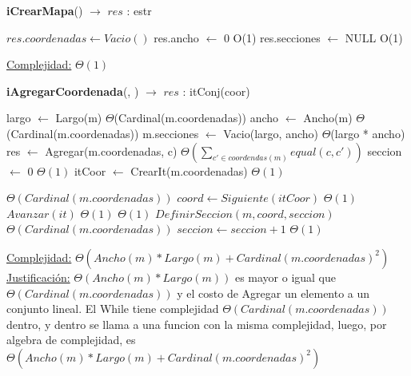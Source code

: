 \begin{Algoritmos}

\medskip
	
  	\medskip
  
\begin{algorithm}[H]{\textbf{iCrearMapa}() $\to$ $res$ : estr}
    	\begin{algorithmic}[1]
			\State $res.coordenadas \gets Vacio()$ 
			\State res.ancho $\gets$ 0	\Comment O(1)
			\State res.secciones $\gets$ NULL \Comment O(1)
			
			\medskip
			\Statex \underline{Complejidad:} $\Theta(1)$
    	\end{algorithmic}
\end{algorithm}

\begin{algorithm}[H]{\textbf{iAgregarCoordenada}(, ) $\to$ $res$ : itConj(coor)}
    	\begin{algorithmic}[1]
            \State  largo $\gets$ Largo(m)   \Comment $\Theta$(Cardinal(m.coordenadas))
            \State  ancho $\gets$ Ancho(m) \Comment $\Theta$(Cardinal(m.coordenadas))
            \State  m.secciones $\gets$ Vacio(largo, ancho) \Comment $\Theta$(largo * ancho)
			\State res $\gets$ Agregar(m.coordenadas, c) \Comment $\Theta\left(\displaystyle\sum_{c' \in coordendas(m)}equal(c,c')\right)$
            \State  seccion $\gets$ 0  \Comment $\Theta(1)$
            \State  itCoor $\gets$ CrearIt(m.coordenadas) \Comment $\Theta(1)$
			 
            			\Comment $\Theta(Cardinal(m.coordenadas))$
                \State $coord \gets Siguiente(itCoor)  $ \Comment $\Theta(1)$
			 	\State $Avanzar(it)$		\Comment $\Theta(1)$
                 \Comment $\Theta(1)$
                    \State $ DefinirSeccion(m, coord, seccion) $ \Comment $\Theta(Cardinal(m.coordenadas))$ 
                    \State $ seccion \gets seccion + 1 $ \Comment $\Theta(1)$
                \EndIf
			\EndWhile

			\medskip
			\Statex \underline{Complejidad:} $\Theta(Ancho(m) * Largo(m) + Cardinal(m.coordenadas)^2)$
			\Statex \underline{Justificación:} $\Theta(Ancho(m) * Largo(m))$ es mayor o igual que $\Theta(Cardinal(m.coordenadas))$ y el costo de Agregar un elemento a un conjunto lineal. El While tiene complejidad $\Theta(Cardinal(m.coordenadas))$ dentro, y dentro se llama a una funcion con la misma complejidad, luego, por algebra de complejidad, es $\Theta(Ancho(m) * Largo(m) + Cardinal(m.coordenadas)^2)$
    	\end{algorithmic}
\end{algorithm}


\end{Algoritmos}
